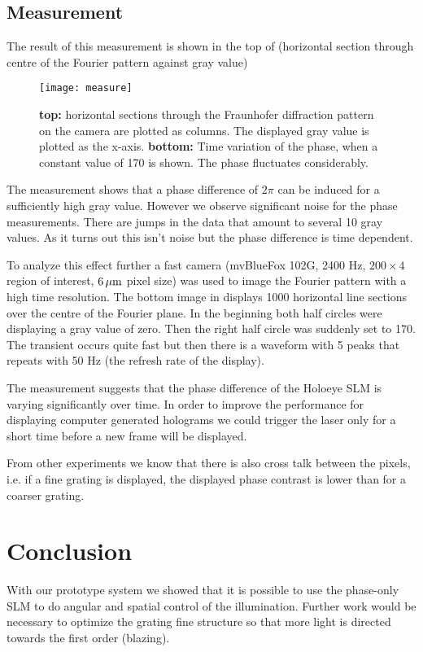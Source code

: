 \subsection{Measurement}
The result of this measurement is shown in the top of
(horizontal section through centre of
the Fourier pattern against gray value)
\begin{figure}[!hbt]
  \centering
  \texttt{[image: measure]}
  \caption{{\bf top:} horizontal sections through the Fraunhofer
    diffraction pattern on the camera are plotted as columns. The
    displayed gray value is plotted as the x-axis. {\bf bottom:} Time
    variation of the phase, when a constant value of 170 is shown. The
    phase fluctuates considerably.}
  \label{fig:holo-transfer}
\end{figure}
The measurement shows that a phase difference of $2\pi$ can be induced
for a sufficiently high gray value. However we observe significant
noise for the phase measurements.  There are jumps in the data that
amount to several 10 gray values. As it turns out this isn't noise but
the phase difference is time dependent.

To analyze this effect further a fast camera (mvBlueFox 102G, 2400 Hz,
$200\times4$ region of interest, $\unit[ 6]{\mu m}$ pixel size) was
used to image the Fourier pattern with a high time resolution.  The
bottom image in  displays 1000 horizontal
line sections over the centre of the Fourier plane. In the beginning
both half circles were displaying a gray value of zero. Then the right
half circle was suddenly set to 170. The transient occurs quite fast
but then there is a waveform with 5 peaks that repeats with 50 Hz (the
refresh rate of the display).

The measurement suggests that the phase difference of the Holoeye SLM
is varying significantly over time. In order to improve the
performance for displaying computer generated holograms we could
trigger the laser only for a short time before a new frame will be
displayed.

From other experiments we know that there is also cross talk between
the pixels, i.e. if a fine grating is displayed, the displayed phase
contrast is lower than for a coarser grating.
\section{Conclusion}
With our prototype system we showed that it is possible to use the
phase-only SLM to do angular and spatial control of the
illumination. Further work would be necessary to optimize the grating
fine structure so that more light is directed towards the first order
(blazing).

